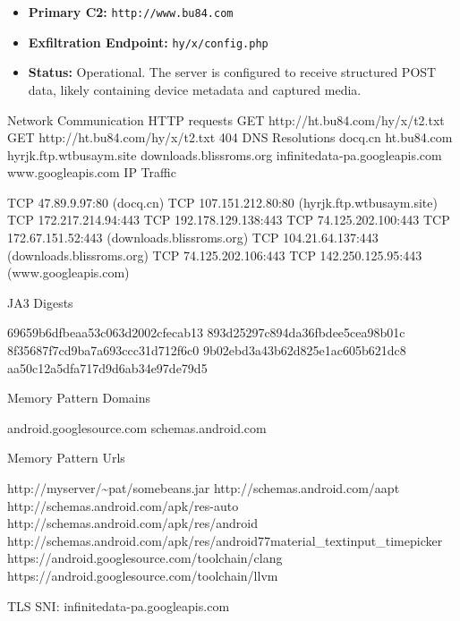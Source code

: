 \documentclass[
]{article}
\newenvironment{Shaded}{}{}
\newcommand{\NormalTok}[1]{#1}
\begin{document}
\begin{itemize}
\item
  \textbf{Primary C2:} \texttt{http://www.bu84.com}
\item
  \textbf{Exfiltration Endpoint:} \texttt{hy/x/config.php}
\item
  \textbf{Status:} Operational. The server is configured to receive
  structured POST data, likely containing device metadata and captured
  media.
\end{itemize}

\begin{Shaded}
\begin{Highlighting}[]
\NormalTok{Network Communication}
\NormalTok{HTTP requests}
\NormalTok{GET http://ht.bu84.com/hy/x/t2.txt}
\NormalTok{GET http://ht.bu84.com/hy/x/t2.txt 404}
\NormalTok{DNS Resolutions}
\NormalTok{docq.cn}
\NormalTok{ht.bu84.com}
\NormalTok{hyrjk.ftp.wtbusaym.site}
\NormalTok{downloads.blissroms.org}
\NormalTok{infinitedata{-}pa.googleapis.com}
\NormalTok{www.googleapis.com}
\NormalTok{IP Traffic}

\NormalTok{    TCP 47.89.9.97:80 (docq.cn)}
\NormalTok{    TCP 107.151.212.80:80 (hyrjk.ftp.wtbusaym.site)}
\NormalTok{    TCP 172.217.214.94:443}
\NormalTok{    TCP 192.178.129.138:443}
\NormalTok{    TCP 74.125.202.100:443}
\NormalTok{    TCP 172.67.151.52:443 (downloads.blissroms.org)}
\NormalTok{    TCP 104.21.64.137:443 (downloads.blissroms.org)}
\NormalTok{    TCP 74.125.202.106:443}
\NormalTok{    TCP 142.250.125.95:443 (www.googleapis.com)}

\NormalTok{JA3 Digests}

\NormalTok{    69659b6dfbeaa53c063d2002cfecab13}
\NormalTok{    893d25297c894da36fbdee5cea98b01c}
\NormalTok{    8f35687f7cd9ba7a693ccc31d712f6c0}
\NormalTok{    9b02ebd3a43b62d825e1ac605b621dc8}
\NormalTok{    aa50c12a5dfa717d9d6ab34e97de79d5}

\NormalTok{Memory Pattern Domains}

\NormalTok{    android.googlesource.com}
\NormalTok{    schemas.android.com}

\NormalTok{Memory Pattern Urls}

\NormalTok{    http://myserver/\textasciitilde{}pat/somebeans.jar}
\NormalTok{    http://schemas.android.com/aapt}
\NormalTok{    http://schemas.android.com/apk/res{-}auto}
\NormalTok{    http://schemas.android.com/apk/res/android}
\NormalTok{    http://schemas.android.com/apk/res/android77material\_textinput\_timepicker}
\NormalTok{    https://android.googlesource.com/toolchain/clang}
\NormalTok{    https://android.googlesource.com/toolchain/llvm}

\NormalTok{TLS}
\NormalTok{SNI: infinitedata{-}pa.googleapis.com}
\end{Highlighting}
\end{Shaded}
\end{document}
